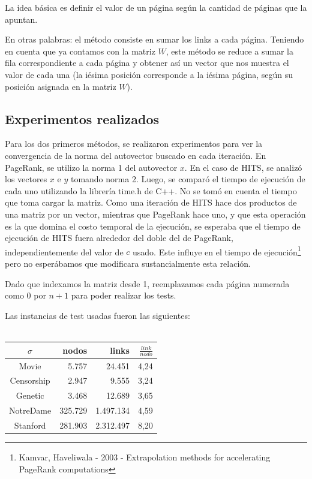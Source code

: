 \documentclass[a4paper]{article}
\begin{document}
La idea b\'asica es definir el valor de un p\'agina seg\'un la cantidad de p\'aginas que la apuntan.

En otras palabras: el método consiste en sumar los links a cada página. Teniendo en cuenta que ya contamos con la matriz $W$, este método se reduce a sumar la fila correspondiente a cada página y obtener as\'i un vector que nos muestra el valor de cada una (la i\'esima posición corresponde a la iésima página, según su posición asignada en la matriz $W$). 


\subsection{Experimentos realizados}
Para los dos primeros métodos, se realizaron experimentos para ver la convergencia de la norma del autovector buscado en cada iteración. En PageRank, se utilizo la norma 1 del autovector $x$. En el caso de HITS, se analizó los vectores $x$ e $y$ tomando norma 2.
Luego, se comparó el tiempo de ejecución de cada uno utilizando la librería time.h de C++. No se tomó en cuenta el tiempo que toma cargar la matriz. Como una iteración de HITS hace dos productos de una matriz por un vector, mientras que PageRank hace uno, y que esta operación es la que domina el costo temporal de la ejecución, se esperaba que el tiempo de ejecución de HITS fuera alrededor del doble del de PageRank, independientemente del valor de $c$ usado. Este influye en el tiempo de ejecución\footnote{Kamvar, Haveliwala - 2003 - Extrapolation methods for accelerating PageRank computations} pero no esperábamos que modificara sustancialmente esta relación.

Dado que indexamos la matriz desde 1, reemplazamos cada página numerada como 0 por $n+1$ para poder realizar los tests.

Las instancias de test usadas fueron las siguientes:\\ \\
\begin{tabular}{c|r |r |r}
$\sigma$ & nodos & links & $\frac{link}{nodo}$\\
\hline
Movie & 5.757 & 24.451 & 4,24\\
\hline
Censorship & 2.947 & 9.555 & 3,24\\
\hline
Genetic & 3.468 & 12.689 & 3,65 \\
\hline
NotreDame & 325.729 & 1.497.134 & 4,59 \\
\hline
Stanford & 281.903 & 2.312.497 & 8,20 \\
\end{tabular}
\end{document}
